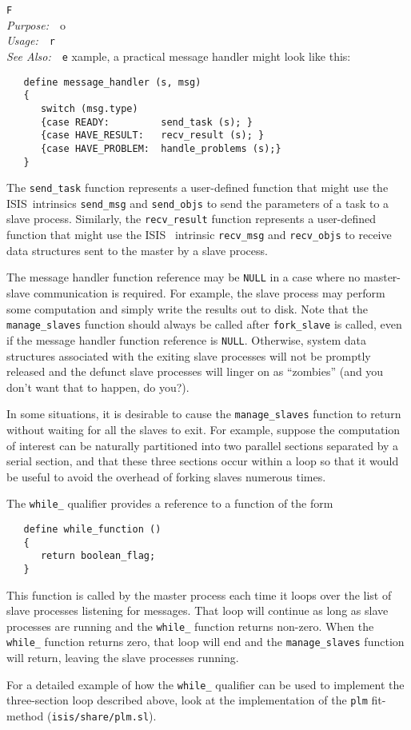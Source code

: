 \documentclass{book}
\makeatletter
\newif\ifpdf
\newcommand{\isisx}{{\sc ISIS~}}
\newenvironment{isisfunction}[4]%
{\index{{#1}@{\tt #1}}%
  \ifpdf
  \else
     \addcontentsline{toc}{subsection}{{#1} -- {#2}}
  \fi
  \vbox{
          \vspace*{\baselineskip}
          {\LARGE\tt #1}\vspace*{\baselineskip}\\
          {{\it Purpose:}~~{#2}}\\
          {{\it Usage:}~~{\tt #3}}\\
          {{\it See Also:}~~{\tt #4}}
       }
}%
{ }
\makeatother
\begin{document}
\begin{isisfunction}
For example, a practical message handler might look like
this:
\begin{verbatim}
   define message_handler (s, msg)
   {
      switch (msg.type)
      {case READY:         send_task (s); }
      {case HAVE_RESULT:   recv_result (s); }
      {case HAVE_PROBLEM:  handle_problems (s);}
   }
\end{verbatim}
The \verb|send_task| function represents a user-defined
function that might use the \isisx intrinsics \verb|send_msg|
and \verb|send_objs| to send the parameters of a task to a
slave process.  Similarly, the \verb|recv_result| function
represents a user-defined function that might use the \isisx
intrinsic \verb|recv_msg| and \verb|recv_objs| to receive data
structures sent to the master by a slave process.

The message handler function reference may be \verb|NULL| in a
case where no master-slave communication is required.  For
example, the slave process may perform some computation and
simply write the results out to disk.  Note that the
\verb|manage_slaves| function should always be called after
\verb|fork_slave| is called, even if the message handler
function reference is \verb|NULL|. Otherwise, system data
structures associated with the exiting slave processes will not
be promptly released and the defunct slave processes will
linger on as ``zombies'' (and you don't want that to happen, do
you?).

In some situations, it is desirable to cause the
\verb|manage_slaves| function to return without waiting for all
the slaves to exit.  For example, suppose the computation of
interest can be naturally partitioned into two parallel
sections separated by a serial section, and that these three
sections occur within a loop so that it would be useful to
avoid the overhead of forking slaves numerous times.

The \verb|while_| qualifier provides a reference to a function
of the form
\begin{verbatim}
   define while_function ()
   {
      return boolean_flag;
   }
\end{verbatim}
This function is called by the master process each time it
loops over the list of slave processes listening for messages.
That loop will continue as long as slave processes are running
and the \verb|while_| function returns non-zero.  When the
\verb|while_| function returns zero, that loop will end and
the \verb|manage_slaves| function will return, leaving the
slave processes running.

For a detailed example of how the \verb|while_| qualifier can
be used to implement the three-section loop described above,
look at the implementation of the \verb|plm| fit-method
(\verb|isis/share/plm.sl|).

\end{isisfunction}
\end{document}

